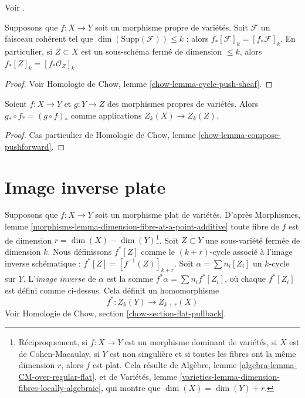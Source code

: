 \begin{lemma}
\label{lemma-push-coherent}
\begin{reference}
Voir \cite[chapitre V]{Serre_algebre_locale}.
\end{reference}
Supposons que $f : X \to Y$ soit un morphisme propre de variétés.
Soit $\mathcal{F}$ un faisceau cohérent tel que
$\dim(\text{Supp}(\mathcal{F})) \leq k$ ; alors
$f_*[\mathcal{F}]_k = [f_*\mathcal{F}]_k$. En particulier, si
$Z \subset X$ est un sous-schéma fermé de dimension $\leq k$, alors
$f_*[Z]_k = [f_*\mathcal{O}_Z]_k$.
\end{lemma}

\begin{proof}
Voir Homologie de Chow, lemme \ref{chow-lemma-cycle-push-sheaf}.
\end{proof}

\begin{lemma}
\label{lemma-compose-pushforward}
Soient $f : X \to Y$ et $g : Y \to Z$ des morphismes propres de
variétés. Alors $g_* \circ f_* = (g \circ f)_*$ comme applications $Z_k(X) \to Z_k(Z)$.
\end{lemma}

\begin{proof}
Cas particulier de Homologie de Chow, lemme \ref{chow-lemma-compose-pushforward}.
\end{proof}



\section{Image inverse plate}
\label{section-flat-pullback}

\noindent
Supposons que $f : X \to Y$ soit un morphisme plat de variétés.
D'après Morphismes, lemme
\ref{morphisms-lemma-dimension-fibre-at-a-point-additive} 
toute fibre de $f$ est de dimension $r = \dim(X) - \dim(Y)$\footnote{Réciproquement,
si $f : X \to Y$ est un morphisme dominant de variétés, si
$X$ est de Cohen-Macaulay, si $Y$ est non singulière et si toutes les fibres ont
la même dimension $r$, alors $f$ est plat. Cela résulte de
Algèbre, lemme \ref{algebra-lemma-CM-over-regular-flat}, et de
Variétés, lemme \ref{varieties-lemma-dimension-fibres-locally-algebraic},
qui montre que $\dim(X) = \dim(Y) + r$.}.
Soit $Z \subset Y$ une sous-variété fermée de dimension $k$. Nous définissons
$f^*[Z]$ comme le $(k + r)$-cycle associé à l'image inverse
schématique : $f^*[Z] = [f^{-1}(Z)]_{k + r}$. Soit
$\alpha = \sum n_i [Z_i]$ un $k$-cycle sur $Y$. L'{\it image inverse} de
$\alpha$ est la somme $f^* \alpha = \sum n_i f^*[Z_i]$, où chaque $f^*[Z_i]$
est défini comme ci-dessus. Cela définit un homomorphisme
$$
f^* : Z_k(Y) \longrightarrow Z_{k + r}(X)
$$
Voir Homologie de Chow, section \ref{chow-section-flat-pullback}.


